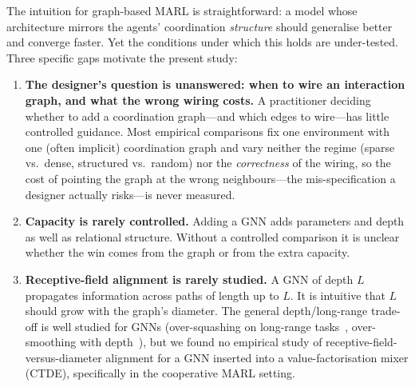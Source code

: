 \documentclass[10pt]{article}
\begin{document}
The intuition for graph-based MARL is straightforward: a model whose
architecture mirrors the agents' coordination \emph{structure} should
generalise better and converge faster. Yet the conditions under which this
holds are under-tested. Three specific gaps motivate the present study:

\begin{enumerate}[leftmargin=*,itemsep=0pt,topsep=2pt]
  \item \textbf{The designer's question is unanswered: when to wire an
        interaction graph, and what the wrong wiring costs.} A practitioner
        deciding whether to add a coordination graph---and which edges to
        wire---has little controlled guidance. Most empirical comparisons
        fix one environment with one (often implicit) coordination graph and
        vary neither the regime (sparse vs.\ dense, structured vs.\ random) nor
        the \emph{correctness} of the wiring, so the cost of pointing the graph
        at the wrong neighbours---the mis-specification a designer actually
        risks---is never measured.
  \item \textbf{Capacity is rarely controlled.} Adding a GNN adds
        parameters and depth as well as relational structure. Without a
        controlled comparison it is unclear whether the win comes from the
        graph or from the extra capacity.
  \item \textbf{Receptive-field alignment is rarely studied.} A GNN of
        depth $L$ propagates information across paths of length up to $L$.
        It is intuitive that $L$ should grow with the graph's diameter. The
        general depth/long-range trade-off is well studied for GNNs
        (over-squashing on long-range tasks~\citep{alon_2021_oversquashing},
        over-smoothing with depth~\citep{li_2018_oversmoothing}), but we
        found no empirical study of receptive-field-versus-diameter alignment
        for a GNN inserted into a value-factorisation mixer (CTDE),
        specifically in the cooperative MARL setting.
\end{enumerate}
\end{document}
